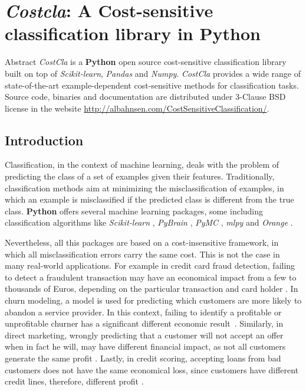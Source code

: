 \chapter{\textit{Costcla}: A Cost-sensitive classification library in \textbf{Python}}\label{ch:9}


\begin{remark}{Abstract}
\textit{CostCla} is a \textbf{Python} open source cost-sensitive classification library built on 
top of \textit{Scikit-learn}, \textit{Pandas} and \textit{Numpy}. \textit{CostCla} provides a wide 
range of state-of-the-art example-dependent cost-sensitive methods for classification tasks. Source 
code, binaries and documentation are distributed under 3-Clause BSD license in the website 
\url{http://albahnsen.com/CostSensitiveClassification/}.
\end{remark}
  
\section{Introduction}
\label{sec:9:intro}

Classification, in the context of machine learning, deals with the problem of predicting the class 
of a set of examples given their features. Traditionally, classification methods aim at minimizing 
the misclassification of examples, in which an example is misclassified if the predicted class is 
different from the true class. 
\textbf{Python} offers several machine learning packages, some including classification algorithms 
like \textit{Scikit-learn} \citep{Pedregosa2011}, \textit{PyBrain} \citep{Schaul2010}, 
\textit{PyMC} \citep{Patil2010}, \textit{mlpy} \citep{Albanese2012} and \textit{Orange} 
\citep{Demsar2013}.

Nevertheless, all this packages are based on a cost-insensitive framework, in which all 
misclassification errors carry the same cost. This is not the case in many real-world applications. 
For example in credit card fraud detection, failing to detect a fraudulent transaction may have 
an economical impact from a few to thousands of Euros, depending on the particular transaction 
and card holder \citep{Ngai2011a}. In churn modeling, a model is used for predicting which
customers are more likely to abandon a service provider. In this context, failing to identify a 
profitable or unprofitable churner has a significant different economic 
result~\citep{Verbraken2013}. Similarly, in direct marketing, wrongly predicting that a customer 
will not accept an offer when in fact he will, may have different financial impact, as not all 
customers generate the same profit \citep{Zadrozny2003}. Lastly, in credit scoring, accepting 
loans from bad customers does not have the same economical loss, since customers have different 
credit lines, therefore, different profit \citep{Verbraken2014}.


